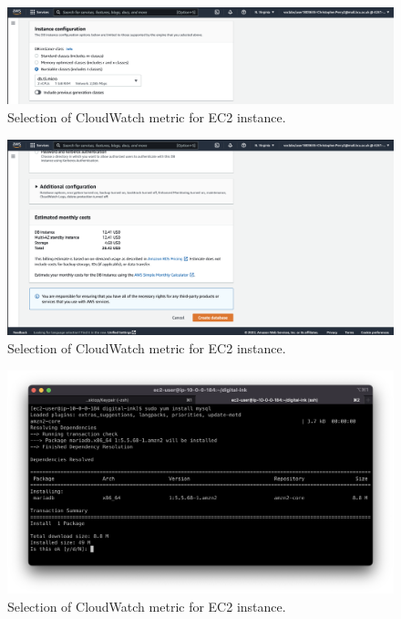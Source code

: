 \begin{figure}[!htbp]
    \centering
    \includegraphics[width=\textwidth]{resources/rds/rds-instance-config.png}
    \caption{Selection of CloudWatch metric for EC2 instance.}
    \label{fig:rds-instance-conf}
\end{figure}

\begin{figure}[!htbp]
    \centering
    \includegraphics[width=\textwidth]{resources/rds/rds-monthly-costs.png}
    \caption{Selection of CloudWatch metric for EC2 instance.}
    \label{fig:rds-costs}
\end{figure}

\begin{figure}[!htbp]
    \centering
    \includegraphics[width=\textwidth]{resources/rds/rds-mysql-install.png}
    \caption{Selection of CloudWatch metric for EC2 instance.}
    \label{fig:rds-msql-install}
\end{figure}

